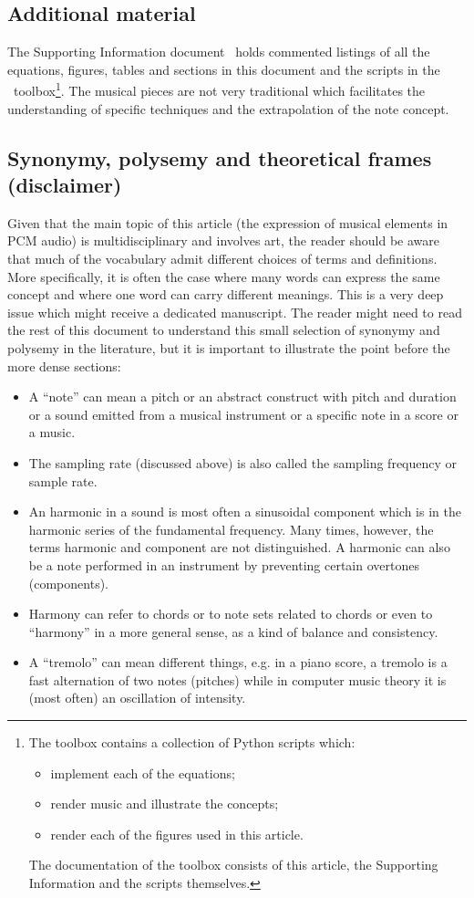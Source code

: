 \subsection{Additional material}
The Supporting Information document~\cite{SI} holds commented listings of all the equations, figures, tables and sections in this document
and the scripts in the \massa\ toolbox\footnote{The toolbox contains a collection of Python scripts which:
\begin{itemize}
    \item implement each of the equations;
    \item render music and illustrate the concepts;
    \item render each of the figures used in this article.
\end{itemize}
The documentation of the toolbox consists of this article, the Supporting Information and the scripts themselves.}.
The musical pieces are not very traditional which facilitates the understanding of specific techniques
and the extrapolation of the note concept.

\subsection{Synonymy, polysemy and theoretical frames (disclaimer)}\label{sec:discl}
Given that the main topic of this article (the expression of musical elements
in PCM audio) is multidisciplinary and involves art,
the reader should be aware that much of the vocabulary admit different choices of terms and definitions.
More specifically, it is often the case where many words can express the same concept
and where one word can carry different meanings.
This is a very deep issue which might receive a dedicated manuscript.
The reader might need to read the rest of this document to understand this
small selection of synonymy and polysemy in the literature,
but it is important to illustrate the point before the more dense sections:
\begin{itemize}
	\item A ``note'' can mean a pitch or an abstract construct with pitch and duration or a sound emitted from a musical instrument or a specific note in a score or a music.
	\item The sampling rate (discussed above) is also called the sampling frequency or sample rate.
	\item An harmonic in a sound is most often a sinusoidal component which is in the harmonic series of the fundamental frequency. Many times, however, the terms harmonic and component are not distinguished. A harmonic can also be a note performed in an instrument by preventing certain overtones (components).
	\item Harmony can refer to chords or to note sets related to chords or even to ``harmony'' in a more general sense, as a kind of balance and consistency.
	\item A ``tremolo'' can mean different things, e.g. in a piano score, a tremolo is a fast alternation of two notes (pitches) while in computer music theory it is (most often) an oscillation of intensity.
\end{itemize}

